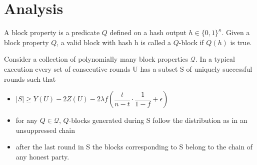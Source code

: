 \section{Analysis}
\begin{definition}
    \cite{dionyziz}
    A block property is a predicate $Q$ defined on a hash output $h \in \{ 0, 1 \}^\kappa$. Given  a block property $Q$, a valid block with hash h is called a $Q$-block if $Q(h)$ is true.
\end{definition}

\begin{lemma}[Unsuppressibility]\cite{dionyziz}
    Consider a collection of polynomially many block properties $\mathcal{Q}$. In a typical execution every set of consecutive rounds U has a subset S of uniquely successful rounds such that
    \begin{itemize}
        \item $\lvert S \rvert \geq Y(U) - 2Z(U) - 2 \lambda f (\dfrac{t}{n-t} \cdot \dfrac{1}{1-f} + \epsilon)$
        \item for any $Q \in \mathcal{Q}$, $Q$-blocks generated during S follow the distribution as in an unsuppressed chain
        \item after the last round in S the blocks corresponding to S belong to the chain of any honest party.
    \end{itemize}
\end{lemma}

